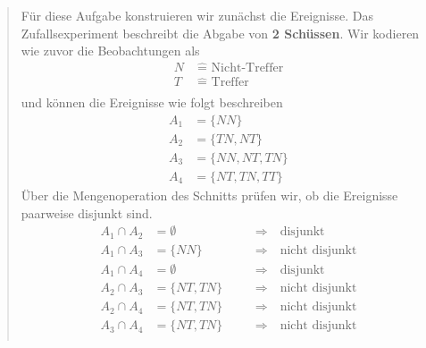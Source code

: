 \documentclass[
]{article}
\begin{document}
\begin{quote}
Für diese Aufgabe konstruieren wir zunächst die Ereignisse. Das
Zufallsexperiment beschreibt die Abgabe von \textbf{2 Schüssen}. Wir
kodieren wie zuvor die Beobachtungen als \[\begin{align}
N &\; \widehat{ = } \text{ Nicht-Treffer}  \\
T &\; \widehat{ = } \text{ Treffer}  \\
\end{align}\] und können die Ereignisse wie folgt beschreiben
\[\begin{align}
A_{1} &= \{ NN  \} \\
A_{2} &= \{  TN ,  NT  \} \\
A_{3} &= \{  NN ,  NT , TN \} \\
A_{4} &= \{ NT, TN, TT \}
\end{align}\] Über die Mengenoperation des Schnitts prüfen wir, ob die
Ereignisse paarweise disjunkt sind. \[\begin{alignat}{2}
A_{1} \cap A_{2} &=  \emptyset \quad &&\Longrightarrow \quad \text{disjunkt} \\
A_{1} \cap A_{3} &=  \{ NN \} \quad &&\Longrightarrow \quad \text{nicht disjunkt} \\ 
A_{1} \cap A_{4} &=  \emptyset \quad &&\Longrightarrow \quad \text{disjunkt} \\  
A_{2} \cap A_{3} &=  \{ NT, TN \} \quad &&\Longrightarrow \quad \text{nicht disjunkt} \\  
A_{2} \cap A_{4} &=  \{ NT, TN \} \quad &&\Longrightarrow \quad \text{nicht disjunkt} \\  
A_{3} \cap A_{4} &=  \{ NT, TN \} \quad &&\Longrightarrow \quad \text{nicht disjunkt} \\  
\end{alignat}\]
\end{quote}
\end{document}
